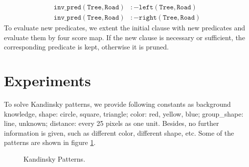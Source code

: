 \documentclass[
]{ceurart}
\begin{document}
\begin{align*}
	\mathtt{inv\_pred(Tree,Road)}&\mathtt{:-left(Tree,Road)} 	\\	
	\mathtt{inv\_pred(Tree,Road)}&\mathtt{:-right(Tree, Road)}
\end{align*}
To evaluate new predicates, we extent the initial clause with new predicates and evaluate them by four score map. If the new clause is necessary or  sufficient, the corresponding predicate is kept, otherwise it is pruned.





\section{Experiments}
To solve Kandinsky patterns, we provide following constants as background knowledge, 
shape: circle, square, triangle; color: red, yellow, blue; group\_shape: line, unknown; distance: every 25 pixels as one unit. Besides, no further information is given, such as different color, different shape, etc. Some of the patterns are shown in figure \ref{fig:kandinsky-patterns}.

\begin{figure}[!htb]
	\centering
	\caption{Kandinsky Patterns.}
	\label{fig:kandinsky-patterns}
\end{figure}
\end{document}
